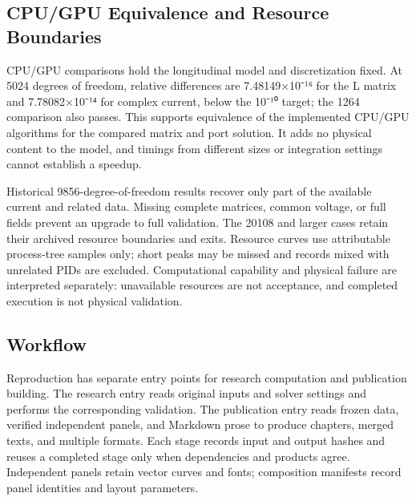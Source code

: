 \documentclass[11pt]{article}
\begin{document}
\subsection*{CPU/GPU Equivalence and Resource Boundaries}
\hypertarget{10.compute.heading}{}
CPU/GPU comparisons hold the longitudinal model and discretization fixed. At 5024 degrees of freedom, relative differences are 7.48149×10⁻¹⁶ for the L matrix and 7.78082×10⁻¹⁴ for complex current, below the 10⁻¹⁰ target; the 1264 comparison also passes. This supports equivalence of the implemented CPU/GPU algorithms for the compared matrix and port solution. It adds no physical content to the model, and timings from different sizes or integration settings cannot establish a speedup.


Historical 9856-degree-of-freedom results recover only part of the available current and related data. Missing complete matrices, common voltage, or full fields prevent an upgrade to full validation. The 20108 and larger cases retain their archived resource boundaries and exits. Resource curves use attributable process-tree samples only; short peaks may be missed and records mixed with unrelated PIDs are excluded. Computational capability and physical failure are interpreted separately: unavailable resources are not acceptance, and completed execution is not physical validation.


\subsection*{Workflow}
\hypertarget{10.workflow.heading}{}
Reproduction has separate entry points for research computation and publication building. The research entry reads original inputs and solver settings and performs the corresponding validation. The publication entry reads frozen data, verified independent panels, and Markdown prose to produce chapters, merged texts, and multiple formats. Each stage records input and output hashes and reuses a completed stage only when dependencies and products agree. Independent panels retain vector curves and fonts; composition manifests record panel identities and layout parameters.
\end{document}
